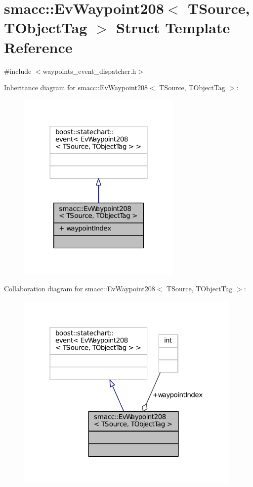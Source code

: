 \hypertarget{structsmacc_1_1EvWaypoint208}{}\section{smacc\+:\+:Ev\+Waypoint208$<$ T\+Source, T\+Object\+Tag $>$ Struct Template Reference}
\label{structsmacc_1_1EvWaypoint208}


{\ttfamily \#include $<$waypoints\+\_\+event\+\_\+dispatcher.\+h$>$}



Inheritance diagram for smacc\+:\+:Ev\+Waypoint208$<$ T\+Source, T\+Object\+Tag $>$\+:
\nopagebreak
\begin{figure}[H]
\begin{center}
\leavevmode
\includegraphics[width=227pt]{structsmacc_1_1EvWaypoint208__inherit__graph}
\end{center}
\end{figure}


Collaboration diagram for smacc\+:\+:Ev\+Waypoint208$<$ T\+Source, T\+Object\+Tag $>$\+:
\nopagebreak
\begin{figure}[H]
\begin{center}
\leavevmode
\includegraphics[width=312pt]{structsmacc_1_1EvWaypoint208__coll__graph}
\end{center}
\end{figure}

